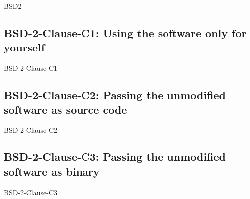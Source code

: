 \begin{license}{BSD2}


\subsection{BSD-2-Clause-C1: Using the software only for yourself}
\begin{lsuc}{BSD-2-Clause-C1}
  
  \lsucmeans{\useCaseOne} 
  \lsuccovers{\coversOne}

  \begin{lsucrequiresnothing}
  \end{lsucrequiresnothing}

  \lsucprohibitsnothing
\end{lsuc}

\subsection{BSD-2-Clause-C2: Passing the unmodified software as source code}
\begin{lsuc}{BSD-2-Clause-C2}

  \lsucmeans{\useCaseTwo}
  \lsuccovers{\coversTwo}

  \begin{lsucrequires}
    \lsucmandatory{\keepLicenseElements}
  \end{lsucrequires}

  \lsucprohibitsnothing
\end{lsuc}

\subsection{BSD-2-Clause-C3: Passing the unmodified software as binary}
\begin{lsuc}{BSD-2-Clause-C3}


\end{lsuc}
\end{license}
